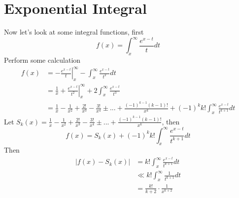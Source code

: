 \documentclass[11pt]{article}
\begin{document}
\section{Exponential Integral}
Now let's look at some integral functions, first \\
\[
f(x)=\int_{x}^{\infty}\frac{e^{x-t}}{t}dt
\]
Perform some calculation\\
\begin{align*}
f(x)&=\left.-\frac{e^{x-t}}{t}\right|_x^\infty-\int_x^\infty\frac{e^{x-t}}{t^2}dt \\
&=\frac{1}{x}+\left.\frac{e^{x-t}}{t^2}\right|_x^\infty+2\int_x^\infty\frac{e^{x-t}}{t^3} \\
&=\frac{1}{x}-\frac{1}{x^2}+\frac{2!}{x^3}-\frac{3!}{x^4}\pm ...+\frac{(-1)^{k-1}(k-1)!}{x^k}+(-1)^kk!\int_x^\infty\frac{e^{x-t}}{t^{k+1}}dt
\end{align*}
Let  \(S_k(x)=\frac{1}{x}-\frac{1}{x^2}+\frac{2!}{x^3}-\frac{3!}{x^4}\pm ...+\frac{(-1)^{k-1}(k-1)!}{x^k}\), then \\
\[
f(x)=S_k(x)+(-1)^kk!\int_x^\infty \frac{e^{x-t}}{t^{k+1}}dt
\]
Then\\
\begin{align*}
|f(x)-S_k(x)|&=k!\int_x^\infty\frac{e^{x-t}}{t^{k+1}}dt \\
&\ll k!\int_x^\infty\frac{1}{t^{k+1}}dt \\
&=\frac{k!}{k+2}\cdot \frac{1}{x^{k+2}}
\end{align*}
\end{document}
